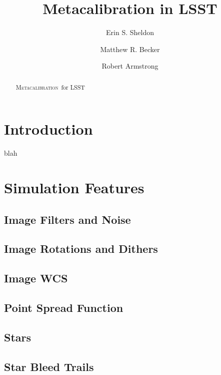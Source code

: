 \documentclass[iop, twocolappendix, appendixfloats, numberedappendix, apj]{hackemulateapj}
\newcommand{\Mcal}{\textsc{Metacalibration}}
\newcommand{\Mdet}{\textsc{Metadetection}}
\begin{document}



\title{Metacalibration in LSST}

\author{Erin S. Sheldon}
\author{Matthew R. Becker}
\author{Robert Armstrong}


\begin{abstract}

    \Mcal\ for LSST

\end{abstract}


\section{Introduction}

blah

\section{Simulation Features}

\subsection{Image Filters and Noise}
\subsection{Image Rotations and Dithers}
\subsection{Image WCS}
\subsection{Point Spread Function}
\subsection{Stars}
\subsection{Star Bleed Trails}
\end{document}
